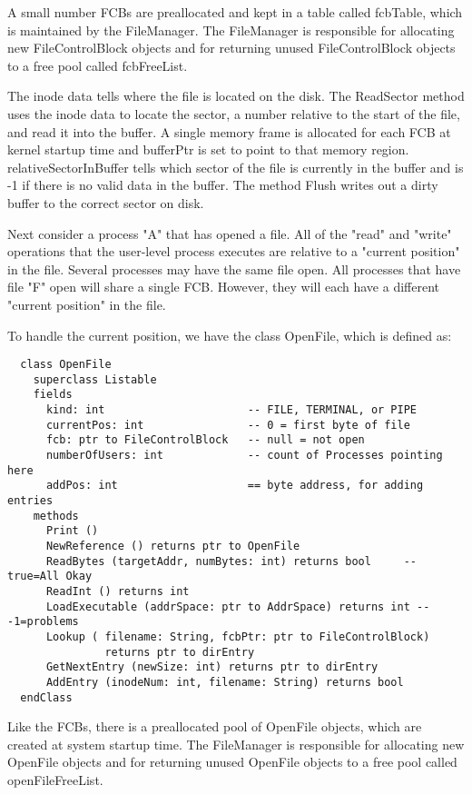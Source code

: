 \documentclass[12pt]{article}
\begin{document}
A small number FCBs are preallocated and kept in a table called
fcbTable, which is maintained by the FileManager.  The FileManager is
responsible for allocating new FileControlBlock objects and for
returning unused FileControlBlock objects to a free pool called
fcbFreeList.

The inode data tells where the file is located on the disk.  The
ReadSector method uses the inode data to locate the sector, a number
relative to the start of the file, and read it into the buffer.  A
single memory frame is allocated for each FCB at kernel startup time
and bufferPtr is set to point to that memory region.
relativeSectorInBuffer tells which sector of the file is currently in
the buffer and is -1 if there is no valid data in the buffer.  The
method Flush writes out a dirty buffer to the correct sector on disk.

Next consider a process "A" that has opened a file.  All of the "read"
and "write" operations that the user-level process executes are
relative to a "current position" in the file.  Several processes may
have the same file open.  All processes that have file "F" open will
share a single FCB.  However, they will each have a different "current
position" in the file.

To handle the current position, we have the class OpenFile, which is
defined as:

\begin{verbatim}
  class OpenFile
    superclass Listable
    fields
      kind: int                      -- FILE, TERMINAL, or PIPE
      currentPos: int                -- 0 = first byte of file
      fcb: ptr to FileControlBlock   -- null = not open
      numberOfUsers: int             -- count of Processes pointing here
      addPos: int                    == byte address, for adding entries
    methods
      Print ()
      NewReference () returns ptr to OpenFile
      ReadBytes (targetAddr, numBytes: int) returns bool     -- true=All Okay
      ReadInt () returns int
      LoadExecutable (addrSpace: ptr to AddrSpace) returns int -- -1=problems
      Lookup ( filename: String, fcbPtr: ptr to FileControlBlock)
               returns ptr to dirEntry
      GetNextEntry (newSize: int) returns ptr to dirEntry
      AddEntry (inodeNum: int, filename: String) returns bool
  endClass
\end{verbatim}

Like the FCBs, there is a preallocated pool of OpenFile objects, which
are created at system startup time.  The FileManager is responsible
for allocating new OpenFile objects and for returning unused OpenFile
objects to a free pool called openFileFreeList.
\end{document}
